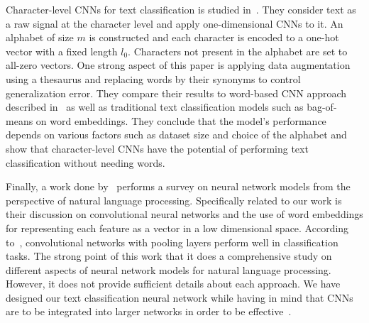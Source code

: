 \documentclass{article} %
\begin{document}
%

Character-level CNNs for text classification is studied in~\cite{nips_text}. They consider text as a raw signal at the character level and apply one-dimensional CNNs to it. An alphabet of size $m$ is constructed and each character is encoded to a one-hot vector with a fixed length $l_0$. Characters not present in the alphabet are set to all-zero vectors. One strong aspect of this paper is applying data augmentation using a thesaurus and replacing words by their synonyms to control generalization error. They compare their results to word-based CNN approach described in~\cite{convtext} as well as traditional text classification models such as bag-of-means on word embeddings. They conclude that the model's performance depends on various factors such as dataset size and choice of the alphabet and show that character-level CNNs have the potential of performing text classification without needing words.

Finally, a work done by~\cite{nn_survery} performs a survey on neural network models from the perspective of natural language processing. Specifically related to our work is their discussion on convolutional neural networks and the use of word embeddings for representing each feature as a vector in a low dimensional space. According to~\cite{nn_survery}, convolutional networks with pooling layers perform well in classification tasks. The strong point of this work that it does a comprehensive study on different aspects of neural network models for natural language processing. However, it does not provide sufficient details about each approach. We have designed our text classification neural network while having in mind that CNNs are to be integrated into larger networks in order to be effective~\cite{goldberg2017neural}.
\end{document}
